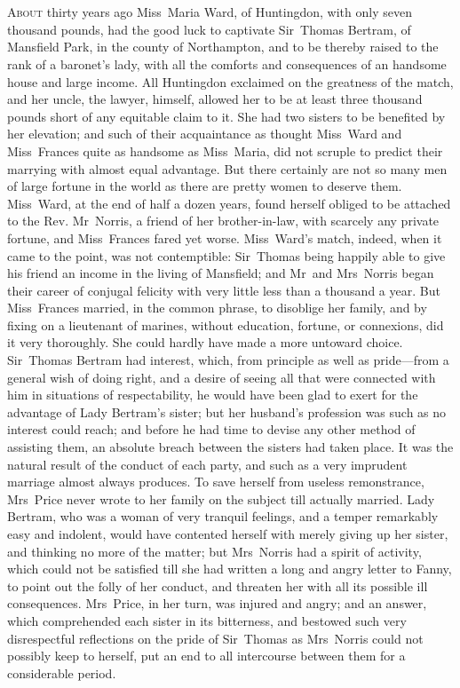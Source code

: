 \chapter[Chapter \thechapter]{} 

 \lettrine[lraise=0.3]{A}{bout} thirty years ago Miss~Maria Ward, of Huntingdon, with only seven thousand pounds, had the good luck to captivate Sir~Thomas Bertram, of Mansfield Park, in the county of Northampton, and to be thereby raised to the rank of a baronet's lady, with all the comforts and consequences of an handsome house and large income. All Huntingdon exclaimed on the greatness of the match, and her uncle, the lawyer, himself, allowed her to be at least three thousand pounds short of any equitable claim to it. She had two sisters to be benefited by her elevation; and such of their acquaintance as thought Miss~Ward and Miss~Frances quite as handsome as Miss~Maria, did not scruple to predict their marrying with almost equal advantage. But there certainly are not so many men of large fortune in the world as there are pretty women to deserve them. Miss~Ward, at the end of half a dozen years, found herself obliged to be attached to the Rev. Mr~Norris, a friend of her brother-in-law, with scarcely any private fortune, and Miss~Frances fared yet worse. Miss~Ward's match, indeed, when it came to the point, was not contemptible: Sir~Thomas being happily able to give his friend an income in the living of Mansfield; and Mr~and Mrs~Norris began their career of conjugal felicity with very little less than a thousand a year. But Miss~Frances married, in the common phrase, to disoblige her family, and by fixing on a lieutenant of marines, without education, fortune, or connexions, did it very thoroughly. She could hardly have made a more untoward choice. Sir~Thomas Bertram had interest, which, from principle as well as pride—from a general wish of doing right, and a desire of seeing all that were connected with him in situations of respectability, he would have been glad to exert for the advantage of Lady Bertram's sister; but her husband's profession was such as no interest could reach; and before he had time to devise any other method of assisting them, an absolute breach between the sisters had taken place. It was the natural result of the conduct of each party, and such as a very imprudent marriage almost always produces. To save herself from useless remonstrance, Mrs~Price never wrote to her family on the subject till actually married. Lady Bertram, who was a woman of very tranquil feelings, and a temper remarkably easy and indolent, would have contented herself with merely giving up her sister, and thinking no more of the matter; but Mrs~Norris had a spirit of activity, which could not be satisfied till she had written a long and angry letter to Fanny, to point out the folly of her conduct, and threaten her with all its possible ill consequences. Mrs~Price, in her turn, was injured and angry; and an answer, which comprehended each sister in its bitterness, and bestowed such very disrespectful reflections on the pride of Sir~Thomas as Mrs~Norris could not possibly keep to herself, put an end to all intercourse between them for a considerable period.

